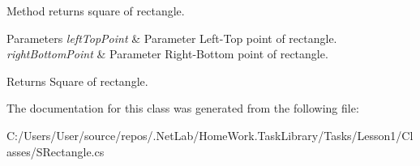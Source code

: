 Method returns square of rectangle. 


\begin{DoxyParams}{Parameters}
{\em left\+Top\+Point} & Parameter Left-\/\+Top point of rectangle.\\
\hline
{\em right\+Bottom\+Point} & Parameter Right-\/\+Bottom point of rectangle.\\
\hline
\end{DoxyParams}
\begin{DoxyReturn}{Returns}
Square of rectangle.
\end{DoxyReturn}


The documentation for this class was generated from the following file\+:\begin{DoxyCompactItemize}
\item 
C\+:/\+Users/\+User/source/repos/.\+Net\+Lab/\+Home\+Work.\+Task\+Library/\+Tasks/\+Lesson1/\+Classes/S\+Rectangle.\+cs\end{DoxyCompactItemize}
